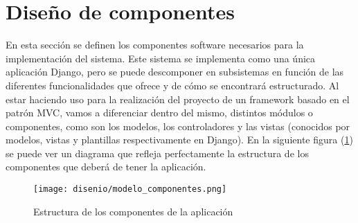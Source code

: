 \section{Diseño de componentes}

En esta sección se definen los componentes software necesarios para la
implementación del sistema. Este sistema se implementa como una única aplicación
Django, pero se puede descomponer en subsistemas en función de las diferentes
funcionalidades que ofrece y de cómo se encontrará estructurado. Al estar
haciendo uso para la realización del proyecto de un framework basado en el
patrón MVC, vamos a diferenciar dentro del mismo, distintos módulos o
componentes, como son los modelos, los controladores y las vistas (conocidos por
modelos, vistas y plantillas respectivamente en Django). En la siguiente figura
(\ref{fig:componentes}) se puede ver un diagrama que refleja perfectamente la
estructura de los componentes que deberá de tener la aplicación.

\newpage

\begin{figure}[H]
    \begin{center}
        \texttt{[image: disenio/modelo\_componentes.png]}
    \end{center}
    \caption{Estructura de los componentes de la aplicación}
    \label{fig:componentes}
\end{figure}

